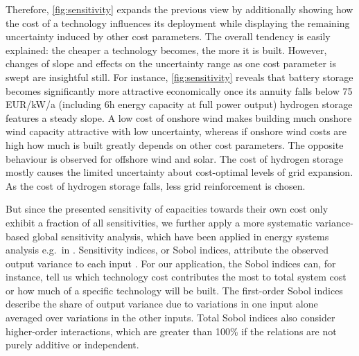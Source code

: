 
Therefore, \cref{fig:sensitivity} expands the previous view by additionally
showing how the cost of a technology influences its deployment while displaying
the remaining uncertainty induced by other cost parameters. The overall tendency
is easily explained: the cheaper a technology becomes, the more it is built.
However, changes of slope and effects on the uncertainty range as one cost
parameter is swept are insightful still. For instance, \cref{fig:sensitivity}
reveals that battery storage becomes significantly more attractive economically
once its annuity falls below 75 EUR/kW/a (including 6h energy capacity at full
power output) hydrogen storage features a steady slope. A low cost of onshore
wind makes building much onshore wind capacity attractive with low uncertainty,
whereas if onshore wind costs are high how much is built greatly depends on
other cost parameters. The opposite behaviour is observed for offshore wind and
solar. The cost of hydrogen storage mostly causes the limited uncertainty about
cost-optimal levels of grid expansion. As the cost of hydrogen storage falls,
less grid reinforcement is chosen.

But since the presented sensitivity of capacities towards their own cost only
exhibit a fraction of all sensitivities, we further apply a more systematic
variance-based global sensitivity analysis, which have been applied in energy
systems analysis e.g.~in
\cite{trondle_trade-offs_2020,mavromatidis_uncertainty_2018}. Sensitivity
indices, or Sobol indices, attribute the observed output variance to each input
\cite{sudret_global_2008}. For our application, the Sobol indices can, for
instance, tell us which technology cost contributes the most to total system
cost or how much of a specific technology will be built. The first-order Sobol
indices describe the share of output variance due to variations in one input
alone averaged over variations in the other inputs. Total Sobol indices also
consider higher-order interactions, which are greater than 100\% if the
relations are not purely additive or independent.

